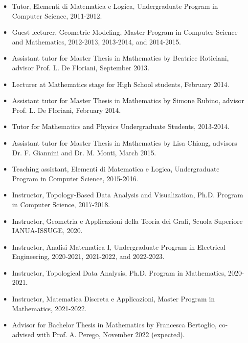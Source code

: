 \documentclass[11pt]{article}
\begin{document}
\begin{itemize}
\item Tutor, Elementi di Matematica e Logica, Undergraduate Program in Computer Science, 2011-2012.
\item Guest lecturer, Geometric Modeling, Master Program in Computer Science and Mathematics, 2012-2013, 2013-2014, and 2014-2015.
\item Assistant tutor for Master Thesis in Mathematics by Beatrice Roticiani, advisor Prof. L. De Floriani, September 2013.
\item Lecturer at Mathematics stage for High School students, February 2014.
\item Assistant tutor for Master Thesis in Mathematics by Simone Rubino, advisor Prof. L. De Floriani, February 2014.
\item Tutor for Mathematics and Physics Undergraduate Students, 2013-2014.
\item Assistant tutor for Master Thesis in Mathematics by Lisa Chiang, advisors Dr. F. Giannini and Dr. M. Monti, March 2015.
\item Teaching assistant, Elementi di Matematica e Logica, Undergraduate Program in Computer Science, 2015-2016.
\item Instructor, Topology-Based Data Analysis and Visualization, Ph.D. Program in Computer Science, 2017-2018.
\item Instructor, Geometria e Applicazioni della Teoria dei Grafi, Scuola Superiore IANUA-ISSUGE, 2020.
\item Instructor, Analisi Matematica I, Undergraduate Program in Electrical Engineering, 2020-2021, 2021-2022, and 2022-2023.
\item Instructor, Topological Data Analysis, Ph.D. Program in Mathematics, 2020-2021.
\item Instructor, Matematica Discreta e Applicazioni, Master Program in Mathematics, 2021-2022.
\item Advisor for Bachelor Thesis in Mathematics by Francesca Bertoglio, co-advised with Prof. A. Perego, November 2022 (expected).
\end{itemize}
\end{document}
